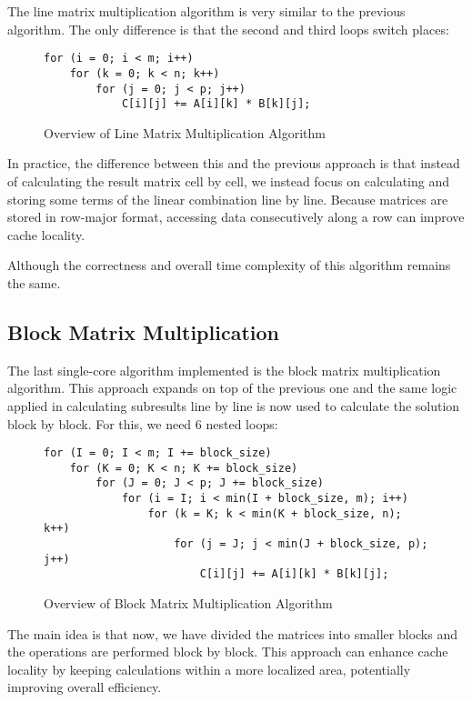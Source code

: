 The line matrix multiplication algorithm is very similar to the previous algorithm. The only difference is that the second and third loops switch places:

\begin{figure}[h!]
\begin{verbatim}
for (i = 0; i < m; i++)
    for (k = 0; k < n; k++)
        for (j = 0; j < p; j++)
            C[i][j] += A[i][k] * B[k][j];
\end{verbatim}
\caption{Overview of Line Matrix Multiplication Algorithm}
\label{fig:algo:line}
\end{figure}

In practice, the difference between this and the previous approach is that instead of calculating the result matrix cell by cell, we instead focus on calculating and storing some terms of the linear combination line by line. Because matrices are stored in row-major format, accessing data consecutively along a row can improve cache locality.

Although the correctness and overall time complexity of this algorithm remains the same. 

\subsection{Block Matrix Multiplication}

The last single-core algorithm implemented is the block matrix multiplication algorithm. This approach expands on top of the previous one and the same logic applied in calculating subresults line by line is now used to calculate the solution block by block. For this, we need 6 nested loops:

\begin{figure}[h!]
\begin{verbatim}
for (I = 0; I < m; I += block_size)
    for (K = 0; K < n; K += block_size)
        for (J = 0; J < p; J += block_size)
            for (i = I; i < min(I + block_size, m); i++)
                for (k = K; k < min(K + block_size, n); k++)
                    for (j = J; j < min(J + block_size, p); j++)
                        C[i][j] += A[i][k] * B[k][j];
\end{verbatim}
\caption{Overview of Block Matrix Multiplication Algorithm}
\label{fig:algo:block}
\end{figure}

The main idea is that now, we have divided the matrices into smaller blocks and the operations are performed block by block. This approach can enhance cache locality by keeping calculations within a more localized area, potentially improving overall efficiency.

